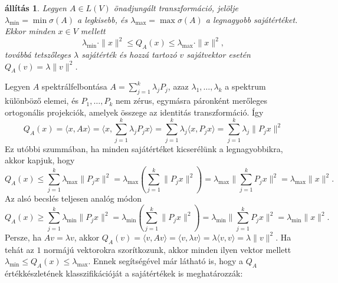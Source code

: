 \documentclass[a4paper, showtrims]{memoir}
\makeatletter
\renewenvironment{proof}[1][\proofname]
    {\par\pushQED{\qed}%
    \normalfont \topsep6\p@\@plus6\p@\relax
    \trivlist
    \item[\hskip\labelsep
        \itshape
    #1\@addpunct{:}]\ignorespaces}
    {\popQED\endtrivlist\@endpefalse}
\theoremstyle{plain}
\newtheorem{proposition}{állítás}[chapter]
\theoremstyle{remark}
\theoremstyle{definition}
\newcommand{\ip}[2]{\langle#1,#2\rangle}
\makeatother
\begin{document}
\begin{proposition}
    Legyen $A\in L\left( V \right)$ önadjungált transzformáció,
    jelölje
    $\lambda_{\min}=\min\sigma\left( A \right)$ a legkisebb,
    és $\lambda_{\max}=\max\sigma\left( A \right)$ a legnagyobb sajátértéket.
    Ekkor minden $x\in V$ mellett
    \[
        \lambda_{\min}\cdot\|x\|^2
        \leq
        Q_A\left( x \right)
        \leq
        \lambda_{\max}\cdot\|x\|^2,
    \]
    továbbá tetszőleges $\lambda$ sajátérték és hozzá tartozó $v$ sajátvektor esetén
    $Q_A\left( v \right)=\lambda\|v\|^2$.
\end{proposition}
\begin{proof}
    Legyen $A$ spektrálfelbontása $A=\sum_{j=1}^k\lambda_jP_j$, 
    azaz $\lambda_1,\ldots,\lambda_k$ a spektrum különböző elemei, 
    és $P_1,\ldots,P_k$ nem zérus, egymásra páronként merőleges ortogonális projekciók, 
    amelyek összege az identitás transzformáció.
    Így
    \[
        Q_A\left( x \right)=
        \ip{x}{Ax}=
        \ip{x}{\sum_{j=1}^k\lambda_jP_jx}
        =
        \sum_{j=1}^k\lambda_j\ip{x}{P_jx}
        =
        \sum_{j=1}^k\lambda_j\|P_jx\|^2
    \]
    Ez utóbbi szummában, ha minden sajátértéket kicserélünk a legnagyobbikra, 
    akkor kapjuk, hogy
    \[
        Q_A\left( x \right)
        \leq
        \sum_{j=1}^k\lambda_{\max}\|P_jx\|^2
        =
        \lambda_{\max}\left( \sum_{j=1}^k\|P_jx\|^2 \right)
        =
        \lambda_{\max}\|\sum_{j=1}^kP_jx\|^2
        =
        \lambda_{\max}\|x\|^2.
    \]
    Az alsó becslés teljesen analóg módon
    \[
        Q_A\left( x \right)
        \geq
        \sum_{j=1}^k\lambda_{\min}\|P_jx\|^2
        =
        \lambda_{\min}\left( \sum_{j=1}^k\|P_jx\|^2 \right)
        =
        \lambda_{\min}\|\sum_{j=1}^kP_jx\|^2
        =
        \lambda_{\min}\|x\|^2.
    \]
    Persze, ha $Av=\lambda v$, akkor 
    $Q_A\left( v \right)
    =
    \ip{v}{Av}
    =
    \ip{v}{\lambda v}
    =
    \lambda\ip{v}{v}
    =\lambda\|v\|^2.
    $
\end{proof}
Ha tehát az $1$ normájú vektorokra szorítkozunk, akkor minden ilyen vektor mellett
\(
\lambda_{\min}\leq Q_A\left( x \right)\leq \lambda_{\max}
\).
Ennek segítségével már látható is, hogy a $Q_A$ értékkészletének klasszifikációját a sajátértékek
is meghatározzák:
\end{document}
